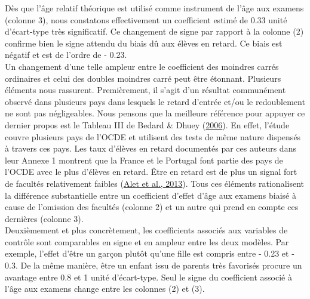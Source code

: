 \documentclass[
]{book}
\begin{document}
\quad Dès que l'âge relatif théorique est utilisé comme instrument de l'âge aux examens (colonne 3), nous constatons effectivement un coefficient estimé de 0.33 unité d'écart-type très significatif. Ce changement de signe par rapport à la colonne (2) confirme bien le signe attendu du biais dû aux élèves en retard. Ce biais est négatif et est de l'ordre de - 0.23.\\
Un changement d'une telle ampleur entre le coefficient des moindres carrés ordinaires et celui des doubles moindres carré peut être étonnant. Plusieurs éléments nous rassurent. Premièrement, il s'agit d'un résultat communément observé dans plusieurs pays dans lesquels le retard d'entrée et/ou le redoublement ne sont pas négligeables. Nous pensons que la meilleure référence pour appuyer ce dernier propos est le Tableau III de Bedard \& Dhuey (\protect\hyperlink{ref-BED:DHU:06}{2006}). En effet, l'étude couvre plusieurs pays de l'OCDE et utilisent des tests de même nature dispensés à travers ces pays. Les taux d'élèves en retard documentés par ces auteurs dans leur Annexe 1 montrent que la France et le Portugal font partie des pays de l'OCDE avec le plus d'élèves en retard. Être en retard est de plus un signal fort de facultés relativement faibles (\protect\hyperlink{ref-ALE:eal:13}{Alet et al., 2013}). Tous ces éléments rationalisent la différence substantielle entre un coefficient d'effet d'âge aux examens biaisé à cause de l'omission des facultés (colonne 2) et un autre qui prend en compte ces dernières (colonne 3).\\
Deuxièmement et plus concrètement, les coefficients associés aux variables de contrôle sont comparables en signe et en ampleur entre les deux modèles. Par exemple, l'effet d'être un garçon plutôt qu'une fille est compris entre - 0.23 et - 0.3. De la même manière, être un enfant issu de parents très favorisés procure un avantage entre 0.8 et 1 unité d'écart-type. Seul le signe du coefficient associé à l'âge aux examens change entre les colonnes (2) et (3).

\newpage
\begingroup\fontsize{7}{9}\selectfont
\end{document}
